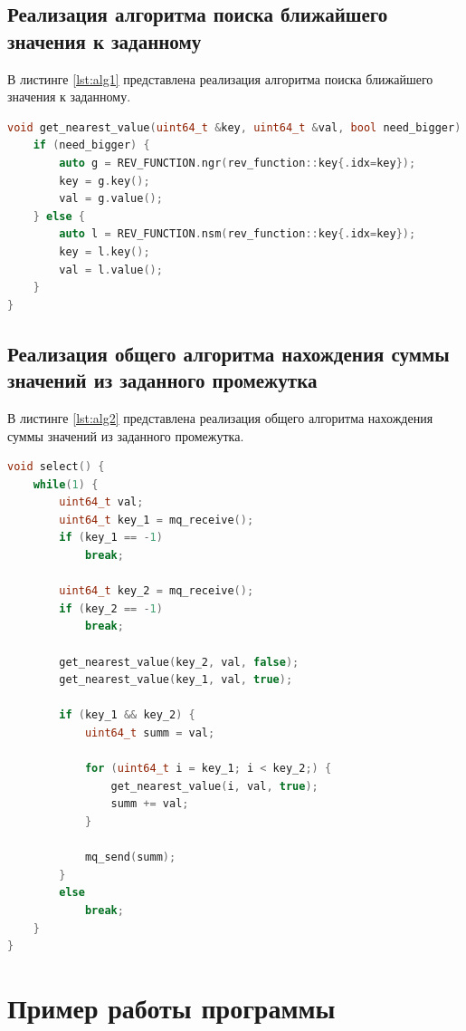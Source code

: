 \section{Реализация алгоритма поиска ближайшего значения к заданному}

В листинге \ref{lst:alg1} представлена реализация алгоритма поиска ближайшего значения к заданному.
\begin{lstlisting}[caption={Листинг реализации алгоритма поиска ближайшего значения к заданному}, label={lst:alg1}, language={c++}]
void get_nearest_value(uint64_t &key, uint64_t &val, bool need_bigger) {
	if (need_bigger) {
		auto g = REV_FUNCTION.ngr(rev_function::key{.idx=key});
		key = g.key();
		val = g.value();
	} else {
		auto l = REV_FUNCTION.nsm(rev_function::key{.idx=key});
		key = l.key();
		val = l.value();
	}
}
\end{lstlisting}

\section{Реализация общего алгоритма нахождения суммы значений из заданного промежутка}

В листинге \ref{lst:alg2} представлена реализация общего алгоритма нахождения суммы значений из заданного промежутка.
\begin{lstlisting}[caption={Листинг реализации общего алгоритма нахождения суммы значений из заданного промежутка}, label={lst:alg2}, language={c++}]
void select() {
	while(1) {
		uint64_t val;
		uint64_t key_1 = mq_receive();
		if (key_1 == -1)
			break;
		
		uint64_t key_2 = mq_receive();
		if (key_2 == -1)
			break;
		
		get_nearest_value(key_2, val, false);
		get_nearest_value(key_1, val, true);
		
		if (key_1 && key_2) {
			uint64_t summ = val;
			
			for (uint64_t i = key_1; i < key_2;) {
				get_nearest_value(i, val, true);
				summ += val;
			}
			
			mq_send(summ);
		}
		else
			break;
	}
}
\end{lstlisting}

\chapter{Пример работы программы}


